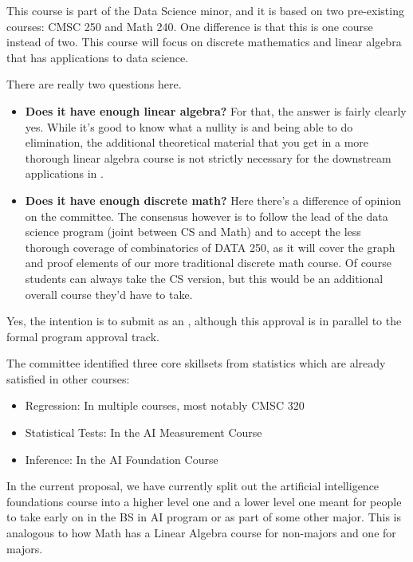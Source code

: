 

This course is part of the Data Science minor, and it is based on two pre-existing courses: CMSC 250 and
Math 240. One difference is that this is one course instead of two. This course will focus on discrete
mathematics and linear algebra that has applications to data science. 

There are really two questions here.  
\begin{itemize}
    \item \textbf{Does it have enough linear algebra?}  For that, the answer is fairly clearly yes.  While it's good to know what a nullity is and being able to do elimination, the additional theoretical material that you get in a more thorough linear algebra course is not strictly necessary for the downstream applications in \ai{}.
    \item \textbf{Does it have enough discrete math?}  Here there's a difference of opinion on the committee.  The consensus however is to follow the lead of the data science program (joint between CS and Math) and to accept the less thorough coverage of combinatorics of DATA 250, as it will cover the graph and proof elements of our more traditional discrete math course.  Of course students can always take the CS version, but this would be an additional overall course they'd have to take.
\end{itemize}



Yes, the intention is to submit as an , although this approval is in parallel to the formal program approval track.


The committee identified three core skillsets from statistics which are already satisfied in other courses:
\begin{itemize}
    \item Regression: In multiple courses, most notably CMSC 320
    \item Statistical Tests: In the AI Measurement Course
    \item Inference: In the AI Foundation Course
\end{itemize}


In the current proposal, we have currently split out the artificial intelligence foundations course into a higher level one and a lower level one meant for people to take early on in the BS in AI program or as part of some other major.  This is analogous to how Math has a Linear Algebra course for non-majors and one for majors.

